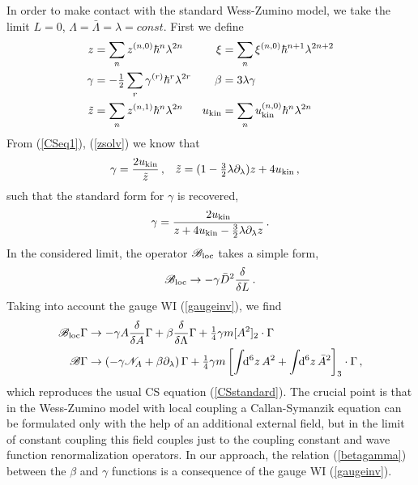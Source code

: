 \documentclass[a4paper,12pt]{article}
\newcommand{\N}{{\mathscr N}}
\newcommand{\B}{{\mathscr B}}
\newcommand{\Bl}{{\mathscr B}_{\rm loc}}
\def\pr{\partial}
\newcommand{\half}{{\textstyle \frac{1}{2}}}
\def\quar{{\textstyle \frac{1}{4}}}
\newcommand{\dS}{\!\!{\rm d}^6z\,}
\newcommand{\ukin}{u_{\rm kin}}
\newcommand{\tfr}[2]{{\textstyle \frac{#1}{#2}}}
\newcommand{\fdq}[2]{\frac{\delta #1}{\delta #2}}
\begin{document}
In order to make contact with the standard Wess-Zumino model, we take
the limit $L=0$, $\Lambda=\bar\Lambda=\lambda=const$. First we define
\begin{align}
z &= \sum_n z^{(n,0)} \hbar^n \lambda^{2n} & 
\xi &= \sum_n \xi^{(n,0)} \hbar^{n+1} \lambda^{2n+2} \\
\gamma &= -\half \sum_r \gamma^{(r)} \hbar^r \lambda^{2r}
 &
\beta &= 3\lambda \gamma \label{betagamma} \\
\tilde z &= \sum_n z^{(n,1)} \hbar^n \lambda^{2n} & 
\ukin &= \sum_n \ukin^{(n,0)} \hbar^n \lambda^{2n}
\end{align}
From (\ref{CSeq1}), (\ref{zsolv}) we know that
\begin{align}
\gamma &= \frac{2\ukin}{\tilde z}\,, &
\tilde z &= (1-\tfr{3}{2} \lambda\pr_\lambda) z + 4\ukin\,,
\end{align}
such that the standard form for $\gamma$ is recovered,
\begin{equation}
\gamma = \frac{2\ukin}{z+4\ukin -\tfr{3}{2} \lambda \pr_\lambda z}\,.
\end{equation}
In the considered limit, the operator $\Bl$ takes a simple form,
\begin{equation}
\Bl \to -\gamma \bar D^2 \fdq{}{L}\,.
\end{equation}
Taking into account the gauge WI (\ref{gaugeinv}), we find
\begin{align}
\Bl \Gamma  & \to -\gamma A \fdq{}{A} \Gamma + \beta \fdq{}{\Lambda} \Gamma +
\quar \gamma m [A^2]_2\cdot\Gamma \\
\B \Gamma & \to \left( -\gamma \N_A +
 \beta   \pr_\lambda\right) \Gamma +\quar \gamma  m
  \left[ \int \dS A^2 + 
  \int\dS \bar A^2\right]_3\cdot\Gamma\,, 
\end{align}
which reproduces the usual CS equation (\ref{CSstandard}). The crucial
point is that in the Wess-Zumino model with local coupling a
Callan-Symanzik equation can be formulated only with the help of an
additional external field, but in the limit of constant coupling this field
couples just to the coupling constant and wave function renormalization
operators. 
In our approach, the relation (\ref{betagamma}) between the $\beta$ and
$\gamma$ functions is a consequence of the gauge WI (\ref{gaugeinv}).
 
\end{document}
